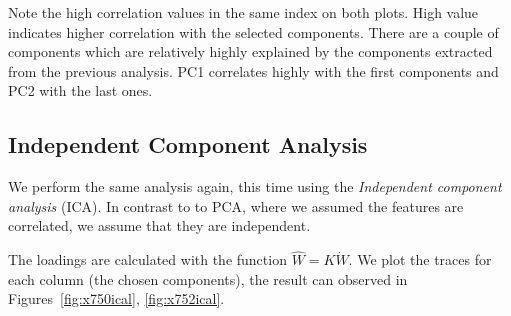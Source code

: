 \documentclass[a4paper,12pt]{article}
\begin{document}
        Note the high correlation values in the same index on both plots. High value indicates higher correlation with the selected components. There are a couple of components which are relatively highly explained by the components extracted from the previous analysis. PC1 correlates highly with the first components and PC2 with the last ones. 


    \subsection*{Independent Component Analysis}

        We perform the same analysis again, this time using the \emph{Independent component analysis} (ICA). In contrast to to PCA, where we assumed the features are correlated, we assume that they are independent. 

        The loadings are calculated with the function \( \hat{W} = K \dot W \). We plot the traces for each column (the chosen components), the result can observed in Figures~\ref{fig:x750ical}, \ref{fig:x752ical}.
        
\end{document}

